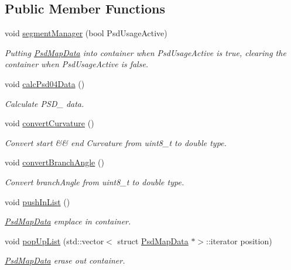 \subsection*{Public Member Functions}
\begin{DoxyCompactItemize}
\item 
void \hyperlink{class_psd_message_decoder_adea08ce30ab67d1a71ab7ea4463ed4a2}{segment\+Manager} (bool Psd\+Usage\+Active)
\begin{DoxyCompactList}\small\item\em Putting \hyperlink{struct_psd_map_data}{Psd\+Map\+Data} into container when Psd\+Usage\+Active is true, clearing the container when Psd\+Usage\+Active is false. \end{DoxyCompactList}\item 
void \hyperlink{class_psd_message_decoder_a34359c377ca6c6940025facd6b177130}{calc\+Psd04\+Data} ()
\begin{DoxyCompactList}\small\item\em Calculate P\+S\+D\+\_ data. \end{DoxyCompactList}\item 
void \hyperlink{class_psd_message_decoder_a88607430974b48dd7379f636f3bb0b35}{convert\+Curvature} ()
\begin{DoxyCompactList}\small\item\em Convert start \&\& end Curvature from uint8\+\_\+t to double type. \end{DoxyCompactList}\item 
void \hyperlink{class_psd_message_decoder_adf3d4c8211c7a08f9de2f74509361ea6}{convert\+Branch\+Angle} ()
\begin{DoxyCompactList}\small\item\em Convert branch\+Angle from uint8\+\_\+t to double type. \end{DoxyCompactList}\item 
void \hyperlink{class_psd_message_decoder_a8fbd5e60c5807f9879de028f4593bbc4}{push\+In\+List} ()
\begin{DoxyCompactList}\small\item\em \hyperlink{struct_psd_map_data}{Psd\+Map\+Data} emplace in container. \end{DoxyCompactList}\item 
void \hyperlink{class_psd_message_decoder_a3f782b96f0fb6f05cd2178c626d7058b}{pop\+Up\+List} (std\+::vector$<$ struct \hyperlink{struct_psd_map_data}{Psd\+Map\+Data} $\ast$$>$\+::iterator position)
\begin{DoxyCompactList}\small\item\em \hyperlink{struct_psd_map_data}{Psd\+Map\+Data} erase out container. \end{DoxyCompactList}\item 
$$
\end{DoxyCompactItemize}
